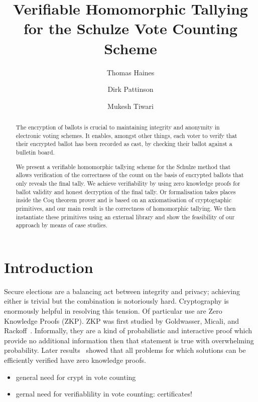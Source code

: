 \documentclass{llncs}
\begin{document}
\title{Verifiable Homomorphic Tallying for the Schulze Vote Counting
Scheme}

\author{Thomas Haines  \and
      Dirk Pattinson \and Mukesh Tiwari }
\maketitle

\begin{abstract}
The encryption of ballots is crucial to maintaining integrity and 
anonymity in electronic voting schemes. It enables, amongst other 
things, each voter to verify that their encrypted ballot has been 
recorded as cast, by checking their ballot against a bulletin board. 

We present a verifiable homomorphic tallying scheme for the Schulze 
method that allows verification of the correctness of the count on the 
basis of encrypted ballots that only reveals the final tally. We 
achieve verifiability by using zero knowledge proofs for ballot 
validity and honest decryption of the final tally. Or formalisation 
takes places inside the Coq theorem prover and is based on an 
axiomatisation of cryptogtaphic primitives, and our main result is 
the correctness of homomorphic tallying. We then instantiate 
these primitives using an external library and show the feasibility 
of our approach by means of case studies.
\end{abstract}


\section{Introduction}

Secure elections are a balancing act between integrity and privacy;  
achieving either is trivial but the combination is notoriously hard.
Cryptography is enormously helpful in resolving this tension.
Of particular use are Zero Knowledge Proofs (ZKP).  ZKP was 
first studied by Goldwasser, Micali, and Rackoff~\cite{Goldwasser:1985:STOC}.
Informally, they are a kind of probabilistic and interactive proof which provide no additional information
then that statement is true with overwhelming probability.  
Later results~\cite{Goldreich:1991:ACM}\cite{Ben-Or:1988:CRYPTO} showed that 
all problems for which solutions can be efficiently verified have zero knowledge
proofs.

\begin{itemize}
  \item general need for crypt in vote counting
  \item gernal need for verifiablility in vote counting:
  certificates!
\end{itemize}
\end{document}
